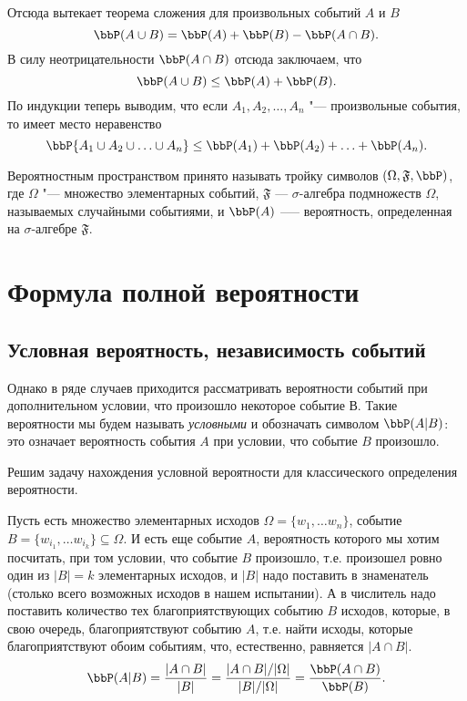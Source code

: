 Отсюда вытекает теорема сложения для произвольных событий $A$ и $B$
$$
\bbP(A \cup B) = \bbP(A) + \bbP(B) - \bbP(A\cap B).
$$
В силу неотрицательности $\bbP(A\cap B)$ отсюда заключаем, что
$$
\bbP(A \cup B) \le \bbP(A) + \bbP(B).
$$
По индукции теперь выводим, что если $A_1,A_2, \ldots,A_n$ "--- произвольные события, то имеет место неравенство
$$
\bbP\{ A_1 \cup A_2 \cup \ldots \cup A_n \} \le \bbP(A_1) + \bbP(A_2) + \ldots + \bbP(A_n).
$$

Вероятностным пространством принято называть тройку символов $(\Omega, \mathfrak{F}, \bbP)$, где $\Omega$ "--- множество элементарных событий, $\mathfrak{F}$ — $\sigma$-алгебра подмножеств $\Omega$, называемых случайными событиями, и $\bbP(A)$ --— вероятность, определенная на $\sigma$-алгебре $\mathfrak{F}$.

\section{Формула полной вероятности}
\subsection{Условная вероятность, независимость событий}

Однако в ряде случаев приходится рассматривать вероятности событий при дополнительном условии, что произошло некоторое событие В. Такие вероятности мы будем называть \textit{условными} и обозначать символом $\bbP(A|B)$: это означает вероятность события $A$ при условии, что событие $B$ произошло.
 
Решим задачу нахождения условной вероятности для классического определения вероятности.

Пусть есть множество элементарных исходов $\Omega=\{w_1,\dots w_n\}$, событие $B=\{w_{i_1},\dots w_{i_k}\} \subseteq \Omega$. И есть еще событие $A$, вероятность которого мы хотим посчитать, при том условии, что событие $B$ произошло, т.е. произошел ровно один из $|B|=k$ элементарных исходов, и $|B|$ надо поставить в знаменатель (столько всего возможных исходов в нашем испытании). А в числитель надо поставить количество тех благоприятствующих событию $B$ исходов, которые, в свою очередь, благоприятствуют событию $A$, т.е. найти исходы, которые благоприятствуют обоим событиям, что, естественно, равняется $|A\cap B|$.
\begin{equation} \label{ch30.2eq1}
\bbP(A|B) = \frac{|A\cap B|}{|B|} = \frac{|A\cap B|/|\Omega|}{|B|/|\Omega|} = \frac{\bbP(A\cap B)}{\bbP(B)}.
\end{equation}

